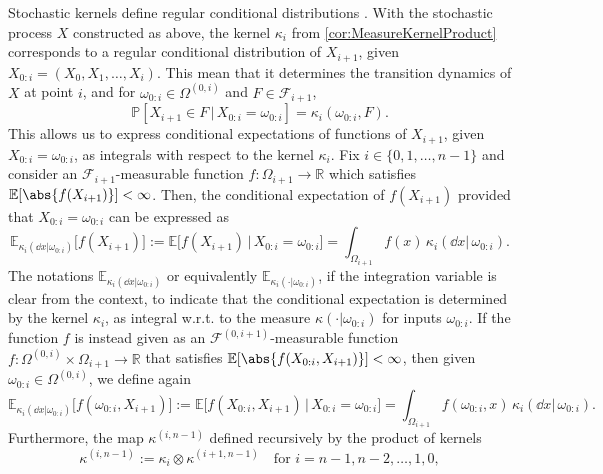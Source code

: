 \documentclass[
    a4paper,
    11pt,
    bibliography=totoc,
    listof=totoc,      
    headinclude=true,
    cleardoublepage=empty,
]{scrbook}
\theoremstyle{plain}
\theoremstyle{definition}
\theoremstyle{remark}
\newcommand{\SetR}{\mathbb R}
\newcommand{\E}{\mathbb E}
\newcommand{\PM}{\mathbb P}
\begin{document}
Stochastic kernels define regular conditional distributions 
\cite[Definition~8.28]{klenke2020_ptcc}. With the stochastic process $X$ 
constructed as above, the kernel $\kappa_i$ from 
\cref{cor:MeasureKernelProduct} corresponds to a regular conditional 
distribution of $X_{i+1}$, given $X_{0:i} = (X_0,X_1,\dots,X_i)$. This mean 
that it determines the transition dynamics of $X$ at point $i$, and for 
$\omega_{0:i}\in \Omega^{(0,i)}$ and $F\in\mathcal{F}_{i+1}$,
\begin{equation}
    \PM[X_{i+1}\in F \,|\, X_{0:i} 
    = \omega_{0:i}] = \kappa_{i}(\omega_{0:i}, F).
\end{equation}
This allows us to express conditional expectations of functions of $X_{i+1}$, 
given $X_{0:i}=\omega_{0:i}$, as integrals with respect to the kernel 
$\kappa_i$. Fix $i\in\{0,1,\dots,n-1\}$ and consider an 
$\mathcal{F}_{i+1}$-measurable function $f:\Omega_{i+1}\to\SetR$
which satisfies $\E[\abs{f(X_{i+1})}]<\infty$. Then, the conditional 
expectation of $f(X_{i+1})$ provided that $X_{0:i}=\omega_{0:i}$ can be 
expressed as
\begin{equation}
\label{eq:ConditionalExpectationSingle}    
    \E_{\kappa_i(\dd{x} |\omega_{0:i})}\bigl[f(X_{i+1})\bigr] 
    := \E\bigl[f(X_{i+1}) \,\big|\, X_{0:i}=\omega_{0:i} \bigr]
    = \int_{\Omega_{i+1}} f(x) \,\kappa_i(\dd{x} | \, \omega_{0:i}).
\end{equation}
The notations $\E_{\kappa_i(\dd{x} |
\omega_{0:i})}$ or equivalently $\E_{\kappa_i(\cdot |
\omega_{0:i})}$, if the integration variable is clear from the context, to indicate that the conditional expectation is determined by 
the kernel $\kappa_i$, as integral w.r.t. to the measure $\kappa(\cdot|
\omega_{0:i})$ for inputs $\omega_{0:i}$. 
%
If the function $f$ is instead given as an $\mathcal{F}^{(0,i+1)}$-measurable 
function $f:\Omega^{(0,i)}\times\Omega_{i+1}\to\SetR$ that satisfies 
$\E[\abs{f(X_{0:i},X_{i+1})}]<\infty$, then given $\omega_{0:i} \in 
\Omega^{(0,i)}$, we define again
\begin{equation}
\label{eq:ConditionalExpectationMultipleOne}
    \E_{\kappa_i(\dd{x} |\omega_{0:i})}\bigl[f(\omega_{0:i}, X_{i+1})\bigr] 
    := \E\bigl[f(X_{0:i}, X_{i+1}) \,\big|\, X_{0:i}=\omega_{0:i}\bigr]
    = \int_{\Omega_{i+1}} f(\omega_{0:i}, x) \,\kappa_i(\dd{x}|\,\omega_{0:i}).
\end{equation}
Furthermore, the map $\kappa^{(i,n-1)}$ defined recursively by the product of kernels
\begin{equation}
\label{eq:KernelRecursionBackwards}
    \kappa^{(i,n-1)} :=  \kappa_i \otimes \kappa^{(i+1,n-1)}
    \quad \text{for } i= n-1, n-2, \dots,1,0,
\end{equation}
\end{document}
